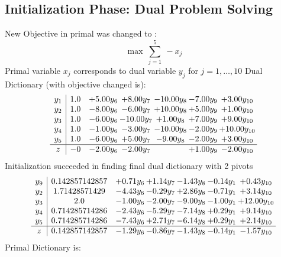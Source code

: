 \documentclass[8pt]{article}
\begin{document}
\subsection{Initialization Phase: Dual Problem Solving}
New Objective in primal was changed to : \[ \max\ \sum_{j=1}^{5}\ - x_j \] 
Primal variable $x_j$ corresponds to dual variable $y_j$ for $j = 1,\ldots,10$
Dual Dictionary (with objective changed is): 
\[\begin{array}{c| c c@{\hskip 2pt} c@{\hskip 2pt} c@{\hskip 2pt} c@{\hskip 2pt} c@{\hskip 2pt} }
 y_{1}   &  1.0 & +  5.00 y_{6} & +  8.00 y_{7} & -10.00 y_{8} & -7.00 y_{9} & +  3.00 y_{10}\\
 y_{2}   &  1.0 & -8.00 y_{6} & -6.00 y_{7} & + 10.00 y_{8} & +  5.00 y_{9} & +  1.00 y_{10}\\
 y_{3}   &  1.0 & -6.00 y_{6} & -10.00 y_{7} & +  1.00 y_{8} & +  7.00 y_{9} & +  9.00 y_{10}\\
 y_{4}   &  1.0 & -1.00 y_{6} & -3.00 y_{7} & -10.00 y_{8} & -2.00 y_{9} & + 10.00 y_{10}\\
 y_{5}   &  1.0 & -6.00 y_{6} & +  5.00 y_{7} & -9.00 y_{8} & -2.00 y_{9} & +  3.00 y_{10}\\
\hline
z    &  -0 & -2.00 y_{6} & -2.00 y_{7} &   & +  1.00 y_{9} & -2.00 y_{10}\\
\end{array}\]
Initialization succeeded in finding final dual dictionary with 2 pivots
\[\begin{array}{c| c c@{\hskip 2pt} c@{\hskip 2pt} c@{\hskip 2pt} c@{\hskip 2pt} c@{\hskip 2pt} }
 y_{9}   &  0.142857142857 & +  0.71 y_{6} & +  1.14 y_{7} & -1.43 y_{8} & -0.14 y_{1} & +  0.43 y_{10}\\
 y_{2}   &  1.71428571429 & -4.43 y_{6} & -0.29 y_{7} & +  2.86 y_{8} & -0.71 y_{1} & +  3.14 y_{10}\\
 y_{3}   &  2.0 & -1.00 y_{6} & -2.00 y_{7} & -9.00 y_{8} & -1.00 y_{1} & + 12.00 y_{10}\\
 y_{4}   &  0.714285714286 & -2.43 y_{6} & -5.29 y_{7} & -7.14 y_{8} & +  0.29 y_{1} & +  9.14 y_{10}\\
 y_{5}   &  0.714285714286 & -7.43 y_{6} & +  2.71 y_{7} & -6.14 y_{8} & +  0.29 y_{1} & +  2.14 y_{10}\\
\hline
z    &  0.142857142857 & -1.29 y_{6} & -0.86 y_{7} & -1.43 y_{8} & -0.14 y_{1} & -1.57 y_{10}\\
\end{array}\]
Primal Dictionary is:
\end{document}
